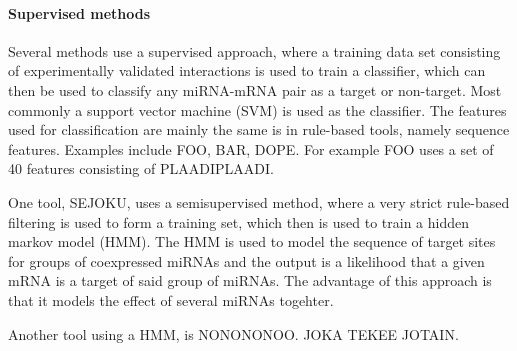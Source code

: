



\paragraph{Supervised methods}
Several methods use a supervised approach, where a training data set
consisting of experimentally validated interactions is used to train
a classifier, which can then be used to classify any miRNA-mRNA pair
as a target or non-target. Most commonly a support vector machine (SVM) is used
as the classifier. The features used for classification are
mainly the same is in rule-based tools, namely sequence features.
Examples include FOO, BAR, DOPE. For example FOO uses a set of
40 features consisting of PLAADIPLAADI.

One tool, SEJOKU, uses a semisupervised method, where a very strict
rule-based filtering is used to form a training set, which then
is used to train a hidden markov model (HMM). The HMM is used
to model the sequence of target sites for groups of coexpressed miRNAs
and the output is a likelihood that a given mRNA is a target of said
group of miRNAs. The advantage of this approach is that it models
the effect of several miRNAs togehter.

Another tool using a HMM, is NONONONOO. JOKA TEKEE JOTAIN.






